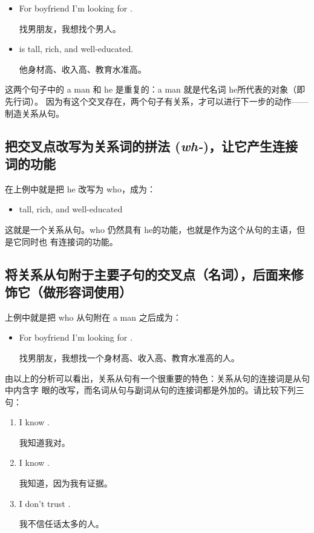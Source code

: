 \begin{itemize}
\item For boyfriend I'm looking for .

  找男朋友，我想找个男人。
\item {} is tall, rich, and well-educated.

  他身材高、收入高、教育水准高。
\end{itemize}
这两个句子中的 a man 和 he 是重复的：a man 就是代名词 he所代表的对象（即先行词）。
因为有这个交叉存在，两个句子有关系，才可以进行下一步的动作——制造关系从句。

\subsection{把交叉点改写为关系词的拼法 (\emph{wh-})，让它产生连接词的功能}

在上例中就是把 he 改写为 who，成为：
\begin{itemize}
\item {}  tall, rich, and well-educated
\end{itemize}
这就是一个关系从句。who 仍然具有 he的功能，也就是作为这个从句的主语，但是它同时也
有连接词的功能。

\subsection{将关系从句附于主要子句的交叉点（名词），后面来修饰它（做形容词使用）}

上例中就是把 who 从句附在 a man 之后成为：
\begin{itemize}
\item For boyfriend I'm looking for  .

  找男朋友，我想找一个身材高、收入高、教育水准高的人。
\end{itemize}

由以上的分析可以看出，关系从句有一个很重要的特色：关系从句的连接词是从句中内含字
眼的改写，而名词从句与副词从句的连接词都是外加的。请比较下列三句：

\begin{enumerate}
\item I know .

  我知道我对。
\item I know   .

  我知道，因为我有证据。
\item I don't trust  .

  我不信任话太多的人。
\end{enumerate}

